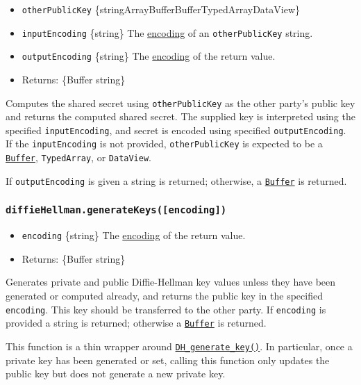 \begin{itemize}
\tightlist
\item
  \texttt{otherPublicKey}
  \{string\textbar ArrayBuffer\textbar Buffer\textbar TypedArray\textbar DataView\}
\item
  \texttt{inputEncoding} \{string\} The
  \href{buffer.md\#buffers-and-character-encodings}{encoding} of an
  \texttt{otherPublicKey} string.
\item
  \texttt{outputEncoding} \{string\} The
  \href{buffer.md\#buffers-and-character-encodings}{encoding} of the
  return value.
\item
  Returns: \{Buffer \textbar{} string\}
\end{itemize}

Computes the shared secret using \texttt{otherPublicKey} as the other
party's public key and returns the computed shared secret. The supplied
key is interpreted using the specified \texttt{inputEncoding}, and
secret is encoded using specified \texttt{outputEncoding}. If the
\texttt{inputEncoding} is not provided, \texttt{otherPublicKey} is
expected to be a \href{buffer.md}{\texttt{Buffer}}, \texttt{TypedArray},
or \texttt{DataView}.

If \texttt{outputEncoding} is given a string is returned; otherwise, a
\href{buffer.md}{\texttt{Buffer}} is returned.

\subsubsection{\texorpdfstring{\texttt{diffieHellman.generateKeys({[}encoding{]})}}{diffieHellman.generateKeys({[}encoding{]})}}\label{diffiehellman.generatekeysencoding}

\begin{itemize}
\tightlist
\item
  \texttt{encoding} \{string\} The
  \href{buffer.md\#buffers-and-character-encodings}{encoding} of the
  return value.
\item
  Returns: \{Buffer \textbar{} string\}
\end{itemize}

Generates private and public Diffie-Hellman key values unless they have
been generated or computed already, and returns the public key in the
specified \texttt{encoding}. This key should be transferred to the other
party. If \texttt{encoding} is provided a string is returned; otherwise
a \href{buffer.md}{\texttt{Buffer}} is returned.

This function is a thin wrapper around
\href{https://www.openssl.org/docs/man3.0/man3/DH_generate_key.html}{\texttt{DH\_generate\_key()}}.
In particular, once a private key has been generated or set, calling
this function only updates the public key but does not generate a new
private key.


